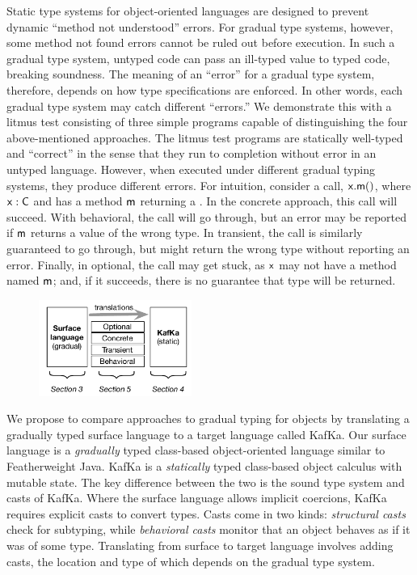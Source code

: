 \documentclass[a4paper,UKenglish]{lipics-v2018}
\newcommand{\EM}[1]{\ensuremath{#1}\xspace}
\newcommand{\xt}[1]{{\sf{#1}}}
\newcommand{\EMxt}[1]{\EM{\xt{#1}}}
\newcommand{\x}{\EMxt x}
\newcommand{\m}{\EMxt m}
\newcommand{\kafka}{{\sf KafKa}\xspace}
\begin{document}
Static type systems for object-oriented languages are designed to prevent dynamic ``method not understood'' errors. For
gradual type systems, however, some method not found errors cannot be ruled out before
execution. In such a gradual type system, untyped code can pass an ill-typed value to typed code, breaking soundness. 
The meaning of an ``error'' for a gradual type system, therefore, depends on how type specifications are
enforced. In other words, each gradual type system may catch different
``errors.'' We demonstrate this with a litmus test consisting of three
simple programs capable of distinguishing the four above-mentioned
approaches. The litmus test programs are statically well-typed and
``correct'' in the sense that they run to completion without error in an
untyped language. However, when executed under different gradual typing
systems, they produce different errors. For intuition, consider a call,
\EM{\x.\m()}, where \EM{\x:\C} and \C has a method \m returning a \D. In
the concrete approach, this call will succeed. With behavioral, the call
will go through, but an error may be reported if \m returns a value of the
wrong type. In transient, the call is similarly guaranteed to go through,
but might return the wrong type without reporting an error. Finally, in
optional, the call may get stuck, as \x may not have a method named \m; and,
if it succeeds, there is no guarantee that type \D will be returned.

\begin{figure}
\vspace{-6mm}
\includegraphics[width=5cm]{fig1}
\vspace{-8mm}\end{figure}

We propose to compare approaches to gradual typing for objects by
translating a gradually typed surface language to a target language called
\kafka. Our surface language is a \emph{gradually} typed class-based object-oriented 
language similar to Featherweight Java. \kafka is a
\emph{statically} typed class-based object calculus with mutable state. The
key difference between the two is the sound type system and casts of \kafka.
Where the surface language allows implicit coercions, \kafka requires
explicit casts to convert types. Casts come in two kinds: \emph{structural
casts} check for subtyping, while \emph{behavioral casts} monitor that an
object behaves as if it was of some type. Translating from surface to target
language involves adding casts, the location and type of which depends on
the gradual type system.
\end{document}
